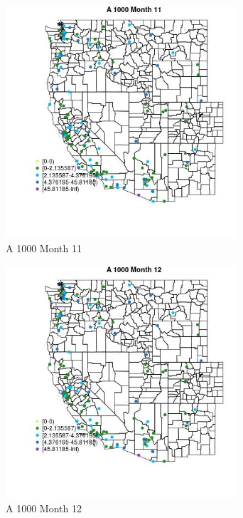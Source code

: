 \begin{figure} 
\centering  
\includegraphics[width=0.77\textwidth]{Code_Outputs/Report_ML_input_PM25_Step4_part_e_de_duplicated_aves_MapObsMo11A_1000.jpg} 
\caption{\label{fig:Report_ML_input_PM25_Step4_part_e_de_duplicated_avesMapObsMo11A_1000}A 1000 Month 11} 
\end{figure} 
 

\begin{figure} 
\centering  
\includegraphics[width=0.77\textwidth]{Code_Outputs/Report_ML_input_PM25_Step4_part_e_de_duplicated_aves_MapObsMo12A_1000.jpg} 
\caption{\label{fig:Report_ML_input_PM25_Step4_part_e_de_duplicated_avesMapObsMo12A_1000}A 1000 Month 12} 
\end{figure} 
 

